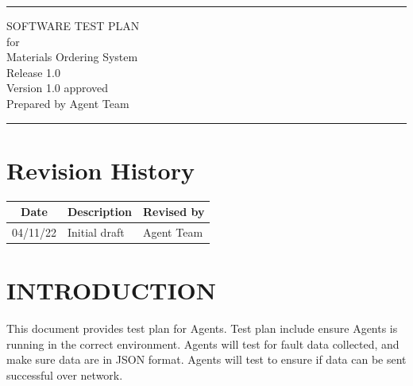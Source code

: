 \documentclass[letterpaper,12pt,oneside,listof=totoc]{scrreprt}
\date{\today}
\author{} %
\def\myversion{1.0 }
\begin{document}
\begin{titlepage}
\flushright
\rule{\textwidth}{5pt}\vskip1cm
\Huge{SOFTWARE TEST PLAN}\\
\vspace{1.5cm}
for\\
\vspace{1.5cm}
Materials Ordering System\\
\vspace{1.5cm}
\LARGE{Release 1.0\\}
\vspace{1.5cm}
\LARGE{Version \myversion approved\\}
\vspace{1.5cm}
Prepared by Agent Team\\
\vfill
\rule{\textwidth}{5pt}
\end{titlepage}

\tableofcontents

\listoffigures

\listoftables

\chapter*{Revision History}

\begin{tabular}{| c | p{} | p{} |}
\hline
Date     & Description   & Revised by \\
\hline
04/11/22 & Initial draft & Agent Team \\
\hline
\end{tabular}

\chapter{INTRODUCTION}

This document provides test plan for Agents. Test plan include ensure Agents is running in the correct environment. Agents will test for fault data collected, and make sure data are in JSON format. Agents will test to ensure if data can be sent successful over network.
\end{document}
